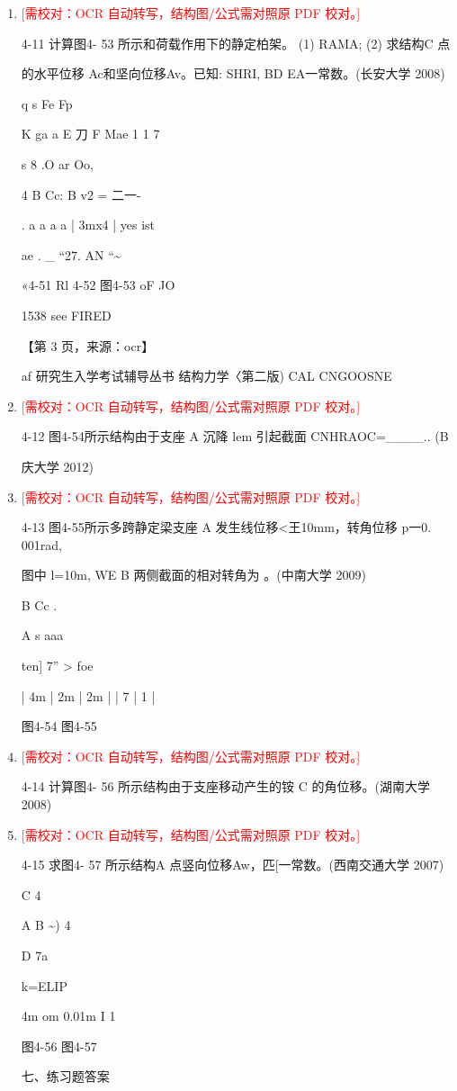 \documentclass[UTF8,12pt,a4paper,openany]{ctexbook}
\newcommand{\TODO}[1]{\textcolor{red}{[需校对：#1]}}
\begin{document}
\begin{enumerate}[label=\textbf{\arabic*.},leftmargin=2em]
\item \TODO{OCR 自动转写，结构图/公式需对照原 PDF 校对。}\par 4-11 计算图4- 53 所示和荷载作用下的静定柏架。 (1) RAMA; (2) 求结构C 点\par 的水平位移 Ac和坚向位移Av。已知: SHRI, BD EA一常数。(长安大学 2008)\par q   s            Fe       Fp\par K                  ga   a                        E      刀   F             Mae 1 1 7\par s               8                      .O ar  Oo,\par 4              B                         Cc:       B        v2 =         二一-\par .   a  a              a    a           |      3mx4      |    yes ist\par ae      .            \_         “27. AN “\textasciitilde{}\par «4-51           Rl 4-52             图4-53        oF JO\par 1538 see FIRED\par \par 【第 3 页，来源：ocr】\par af 研究生入学考试辅导丛书 结构力学〈第二版)         CAL CNGOOSNE
\item \TODO{OCR 自动转写，结构图/公式需对照原 PDF 校对。}\par 4-12 图4-54所示结构由于支座 A 沉降 lem 引起截面 CNHRAOC=\_\_\_\_.. (B\par 庆大学 2012)
\item \TODO{OCR 自动转写，结构图/公式需对照原 PDF 校对。}\par 4-13 图4-55所示多跨静定梁支座 A 发生线位移<王10mm，转角位移 p一0. 001rad,\par 图中 l=10m, WE B 两侧截面的相对转角为 。(中南大学 2009)\par B  Cc                                 .\par A                        s             aaa\par ten] 7”                           > foe\par |   4m  | 2m | 2m |                |    7   |    1   |\par 图4-54                        图4-55
\item \TODO{OCR 自动转写，结构图/公式需对照原 PDF 校对。}\par 4-14 计算图4- 56 所示结构由于支座移动产生的铵 C 的角位移。(湖南大学 2008)
\item \TODO{OCR 自动转写，结构图/公式需对照原 PDF 校对。}\par 4-15 求图4- 57 所示结构A 点竖向位移Aw，匹[一常数。(西南交通大学 2007)\par C                       4\par A          B               \textasciitilde{}) 4\par D      7a\par k=ELIP\par 4m    om 0.01m                   I       1\par 图4-56                        图4-57\par 七、练习题答案

\end{enumerate}
\end{document}
